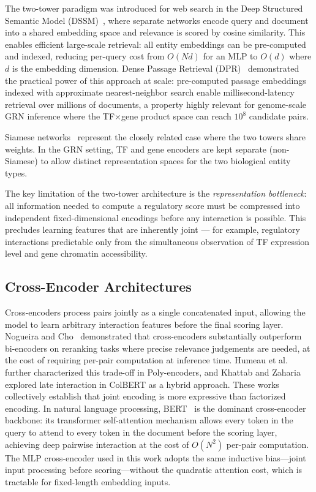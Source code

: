 \documentclass[journal]{IEEEtran}
\begin{document}
The two-tower paradigm was introduced for web search in the Deep Structured
Semantic Model (DSSM)~\cite{huang2013}, where separate networks encode query
and document into a shared embedding space and relevance is scored by cosine
similarity. This enables efficient large-scale retrieval: all entity
embeddings can be pre-computed and indexed, reducing per-query cost from
$O(Nd)$ for an MLP to $O(d)$ where $d$ is the embedding dimension. Dense
Passage Retrieval (DPR)~\cite{karpukhin2020} demonstrated the practical power
of this approach at scale: pre-computed passage embeddings indexed with
approximate nearest-neighbor search enable millisecond-latency retrieval over
millions of documents, a property highly relevant for genome-scale GRN
inference where the TF$\times$gene product space can reach $10^8$ candidate pairs.

Siamese networks~\cite{bromley1993} represent the closely related case where
the two towers share weights. In the GRN setting, TF and gene encoders are
kept separate (non-Siamese) to allow distinct representation spaces for the
two biological entity types.

The key limitation of the two-tower architecture is the
\emph{representation bottleneck}: all information needed to compute a
regulatory score must be compressed into independent fixed-dimensional
encodings before any interaction is possible. This precludes learning
features that are inherently joint --- for example, regulatory interactions
predictable only from the simultaneous observation of TF expression level and
gene chromatin accessibility.

\subsection{Cross-Encoder Architectures}

Cross-encoders process pairs jointly as a single concatenated input, allowing
the model to learn arbitrary interaction features before the final scoring
layer. Nogueira and Cho~\cite{nogueira2019} demonstrated that cross-encoders
substantially outperform bi-encoders on reranking tasks where precise
relevance judgements are needed, at the cost of requiring per-pair computation
at inference time. Humeau et al.~\cite{humeau2020} further characterized this
trade-off in Poly-encoders, and Khattab and Zaharia~\cite{khattab2020}
explored late interaction in ColBERT as a hybrid approach. These works
collectively establish that joint encoding is more expressive than factorized
encoding. In natural language processing, BERT~\cite{devlin2019} is the
dominant cross-encoder backbone: its transformer self-attention mechanism
allows every token in the query to attend to every token in the document
before the scoring layer, achieving deep pairwise interaction at the cost of
$O(N^2)$ per-pair computation. The MLP cross-encoder used in this work adopts
the same inductive bias---joint input processing before scoring---without
the quadratic attention cost, which is tractable for fixed-length embedding
inputs.
\end{document}
